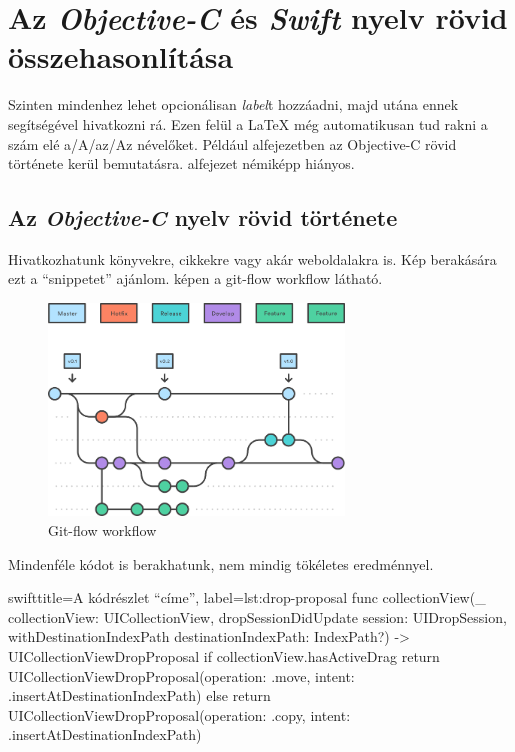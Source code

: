 \chapter{Az \textit{Objective-C} és \textit{Swift} nyelv rövid összehasonlítása}

Szinten mindenhez lehet opcionálisan \textit{label}t hozzáadni, majd utána ennek segítségével hivatkozni rá. Ezen felül a LaTeX még automatikusan tud rakni a szám elé a/A/az/Az névelőket. Például  alfejezetben az Objective-C rövid története kerül bemutatásra.  alfejezet némiképp hiányos.

\section{Az \textit{Objective-C} nyelv rövid története}
\label{sect:objc-c-short-history}
Hivatkozhatunk könyvekre, cikkekre vagy akár weboldalakra is.\cite{UncleBob} Kép berakására ezt a \enquote{snippetet} ajánlom.  képen a git-flow workflow látható.

\begin{figure}[H]
  \centering
  \includegraphics[width=0.7\textwidth, keepaspectratio]{figures/example_image.png}
  \caption{Git-flow workflow}
  \label{fig:git-flow}
\end{figure}

Mindenféle kódot is berakhatunk, nem mindig tökéletes eredménnyel.

\begin{otherlanguage}{english}
  \begin{code}{swift}{title={A kódrészlet  \enquote{címe}}, label={lst:drop-proposal}}
func collectionView(_ collectionView: UICollectionView, dropSessionDidUpdate session: UIDropSession, withDestinationIndexPath destinationIndexPath: IndexPath?) -> UICollectionViewDropProposal {
  if collectionView.hasActiveDrag {
    return UICollectionViewDropProposal(operation: .move, intent: .insertAtDestinationIndexPath)
  } else {
    return UICollectionViewDropProposal(operation: .copy, intent: .insertAtDestinationIndexPath)
  }
}  
  \end{code}
\end{otherlanguage}

